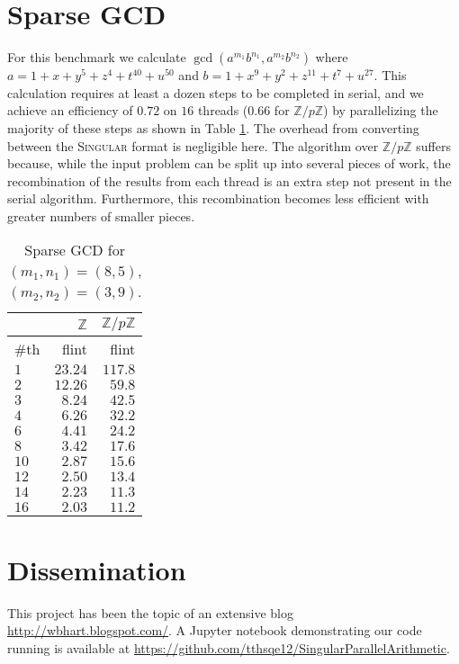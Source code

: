 \documentclass{deliverablereport}
\begin{document}
\section{Sparse GCD}
For this benchmark we calculate $\operatorname{gcd}(a^{m_1}b^{n_1}, a^{m_2}b^{n_2})$\text{,}
where $a=1+x+y^5+z^4+t^{40}+u^{50}$ and $b=1+x^9+y^2+z^{11}+t^7+u^{27}$. This calculation requires at least a dozen steps to be completed in serial, and we achieve an efficiency of $0.72$ on $16$ threads ($0.66$ for $\mathbb{Z}/p\mathbb{Z}$) by parallelizing the majority of these steps as shown in Table \ref{table_sparse_gcd}. The overhead from converting between the \textsc{Singular} format is negligible here. The algorithm over $\mathbb{Z}/p\mathbb{Z}$ suffers because, while the input problem can be split up into several pieces of work, the recombination of the results from each thread is an extra step not present in the serial algorithm. Furthermore, this recombination becomes less efficient with greater numbers of smaller pieces.
\begin{table}
\begin{tabular}{l | r | r | }
 & $\mathbb{Z}$ & $\mathbb{Z}/p \mathbb{Z}$ \\ \hline
\#th   & flint & flint\\ \hline
$1$   & $23.24$ & $117.8$ \\ \hline
$2$   & $12.26$ & $59.8$ \\ \hline
$3$   & $8.24$  & $42.5$ \\ \hline
$4$   & $6.26$  & $32.2$ \\ \hline
$6$   & $4.41$  & $24.2$ \\ \hline
$8$   & $3.42$  & $17.6$ \\ \hline
$10$  & $2.87$  & $15.6$ \\ \hline
$12$  & $2.50$  & $13.4$ \\ \hline
$14$  & $2.23$  & $11.3$ \\ \hline
$16$  & $2.03$  & $11.2$ \\ \hline
\end{tabular}
\caption{Sparse GCD for $(m_1, n_1) = (8, 5)$, $(m_2, n_2) = (3, 9)$.}
\label{table_sparse_gcd}
\end{table}

\section{Dissemination}

This project has been the topic of an extensive blog \url{http://wbhart.blogspot.com/}. A Jupyter notebook demonstrating our code running is available at \url{https://github.com/tthsqe12/SingularParallelArithmetic}.
\end{document}
